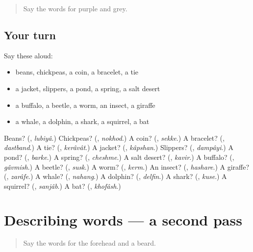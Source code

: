 \begin{quote}
Say the words for purple and grey.
\end{quote}

\subsection*{Your turn}
Say these aloud:

\begin{itemize}
\raggedright
  \item beans, chickpeas, a coin, a bracelet, a tie
  \item a jacket, slippers, a pond, a spring, a salt desert
  \item a buffalo, a beetle, a worm, an insect, a giraffe
  \item a whale, a dolphin, a shark, a squirrel, a bat
\end{itemize}

\begin{tcolorbox}[breakable,colback=teal!4,colframe=teal!35!black,title={Before you move on}]
Beans? (\textbf{}, \emph{lubiyâ}.) Chickpeas? (\textbf{}, \emph{nokhod}.) A coin? (\textbf{}, \emph{sekke}.) A bracelet? (\textbf{}, \emph{dastband}.) A tie? (\textbf{}, \emph{kerâvât}.) A jacket? (\textbf{}, \emph{kâpshan}.) Slippers? (\textbf{}, \emph{dampâyi}.) A pond? (\textbf{}, \emph{barke}.) A spring? (\textbf{}, \emph{cheshme}.) A salt desert? (\textbf{}, \emph{kavir}.) A buffalo? (\textbf{}, \emph{gâvmish}.) A beetle? (\textbf{}, \emph{susk}.) A worm? (\textbf{}, \emph{kerm}.) An insect? (\textbf{}, \emph{hashare}.) A giraffe? (\textbf{}, \emph{zarâfe}.) A whale? (\textbf{}, \emph{nahang}.) A dolphin? (\textbf{}, \emph{delfin}.) A shark? (\textbf{}, \emph{kuse}.) A squirrel? (\textbf{}, \emph{sanjâb}.) A bat? (\textbf{}, \emph{khofâsh}.)
\end{tcolorbox}
\section[(dialogue)]{Describing words — a second pass}

\label{lesson:FA-R127-second-pass-describing-words}



\begin{quote}
Say the words for the forehead and a beard.
\end{quote}

